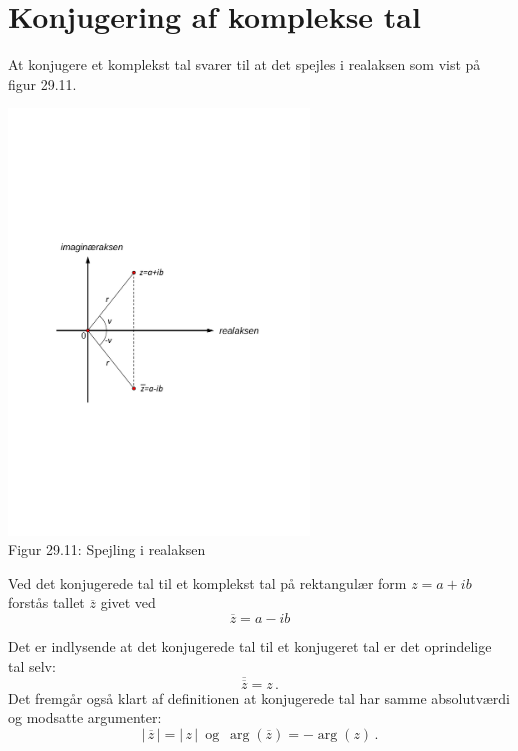 \section{Konjugering af komplekse tal}

At konjugere et komplekst tal svarer til at det spejles i realaksen som vist på figur 29.11.
\begin{center}
	\includegraphics[trim=3cm 9.6cm 3cm 10cm,width=0.6\textwidth,clip]{Geometer/konjugering.pdf}\\
Figur 29.11: Spejling i realaksen 
\end{center}

\begin{definition}
Ved det konjugerede tal til et komplekst tal på rektangulær form $z=a+ib$ forstås tallet $\overline z$ givet ved
\begin{equation}
\overline z=a-ib
\end{equation}
\end{definition}

Det er indlysende at det konjugerede tal til et konjugeret tal er det oprindelige tal selv: 
\begin{equation}
\overline{\overline z}=z\,.
\end{equation}
Det fremgår også klart af definitionen at  konjugerede tal har samme absolutværdi og modsatte argumenter:
\begin{equation}
|\,\overline z\,|=|\,z\,|\,\,\,\mathrm{og}
\,\,\,\arg(\overline z)=-\arg(z)\,.
\end{equation}

